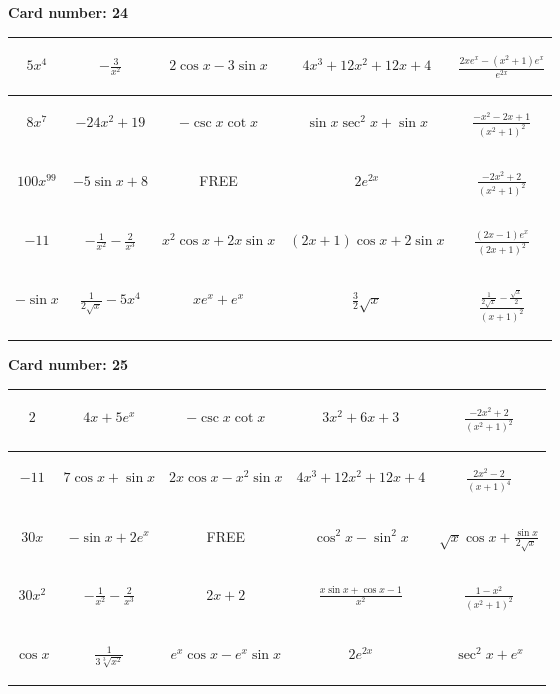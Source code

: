 \documentclass{article}
\newcommand{\entry}[1]{\begin{minipage}[t][2.75cm][t]{4cm} \vspace{1cm} \begin{center}#1\end{center} \end{minipage}}
\newcommand{\freespace}{\entry{FREE}}
\newcommand{\cardnumber}[1]{\noindent \textbf{Card number: #1} \bigskip}
\begin{document}
\pagebreak

\cardnumber{24}
\begin{center}
\begin{tabular}{|*{5}{c|}}
    \hline
    \entry{$5x^4$} & \entry{$-\frac{3}{x^2}$} & \entry{$2 \cos x - 3 \sin x$} & \entry{$4x^3 + 12x^2 + 12x + 4$} & \entry{$\frac{2x e^x - (x^2 + 1) e^x}{e^{2x}}$} \\ \hline
    \entry{$8x^7$} & \entry{$-24x^2 + 19$} & \entry{$-\csc x \cot x$} & \entry{$\sin x \sec^2 x + \sin x$} & \entry{$\frac{-x^2 - 2x + 1}{(x^2 + 1)^2}$} \\ \hline
    \entry{$100x^{99}$} & \entry{$-5 \sin x + 8$} & \freespace & \entry{$2e^{2x}$} & \entry{$\frac{-2x^2 + 2}{(x^2 + 1)^2}$} \\ \hline
    \entry{$-11$} & \entry{$-\frac{1}{x^2} - \frac{2}{x^3}$} & \entry{$x^2 \cos x + 2x \sin x$} & \entry{$(2x + 1) \cos x + 2 \sin x$} & \entry{$\frac{(2x - 1) e^x}{(2x + 1)^2}$} \\ \hline
    \entry{$-\sin x$} & \entry{$\frac{1}{2\sqrt{x}} - 5x^4$} & \entry{$x e^x + e^x$} & \entry{$\frac{3}{2} \sqrt{x}$} & \entry{$\frac{\frac{1}{2 \sqrt{x}} - \frac{\sqrt{x}}{2}}{(x + 1)^2}$} \\ \hline
\end{tabular}
\end{center}

\pagebreak

\cardnumber{25}
\begin{center}
\begin{tabular}{|*{5}{c|}}
    \hline
    \entry{$2$} & \entry{$4x + 5e^x$} & \entry{$-\csc x \cot x$} & \entry{$3x^2 + 6x + 3$} & \entry{$\frac{-2x^2 + 2}{(x^2 + 1)^2}$} \\ \hline
    \entry{$-11$} & \entry{$7 \cos x + \sin x$} & \entry{$2x \cos x - x^2 \sin x$} & \entry{$4x^3 + 12x^2 + 12x + 4$} & \entry{$\frac{2x^2 - 2}{(x + 1)^4}$} \\ \hline
    \entry{$30x$} & \entry{$-\sin x + 2e^x$} & \freespace & \entry{$\cos^2 x - \sin^2 x$} & \entry{$\sqrt{x} \cos x + \frac{\sin x}{2 \sqrt{x}}$} \\ \hline
    \entry{$30x^2$} & \entry{$-\frac{1}{x^2} - \frac{2}{x^3}$} & \entry{$2x + 2$} & \entry{$\frac{x \sin x + \cos x - 1}{x^2}$} & \entry{$\frac{1 - x^2}{(x^2 + 1)^2}$} \\ \hline
    \entry{$\cos x$} & \entry{$\frac{1}{3\sqrt[3]{x^2}}$} & \entry{$e^x \cos x - e^x \sin x$} & \entry{$2e^{2x}$} & \entry{$\sec^2 x + e^x$} \\ \hline
\end{tabular}
\end{center}
\end{document}
